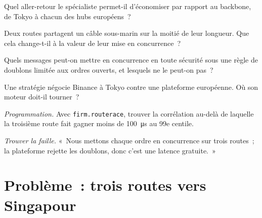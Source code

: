 \begin{exercise}[$\star$]\label{exo:nw:cross-region-crypto-networks:3}
Quel aller-retour le spécialiste permet-il d'économiser par rapport au backbone, de Tokyo à chacun des hubs européens~?
\end{exercise}

\begin{exercise}[$\star\star$]\label{exo:nw:cross-region-crypto-networks:4}
Deux routes partagent un câble sous-marin sur la moitié de leur longueur. Que cela change-t-il à la valeur de leur mise en concurrence~?
\end{exercise}

\begin{exercise}[$\star\star$]\label{exo:nw:cross-region-crypto-networks:5}
Quels messages peut-on mettre en concurrence en toute sécurité sous une règle de doublons limitée aux ordres ouverts, et lesquels ne le peut-on pas~?
\end{exercise}

\begin{exercise}[$\star\star$]\label{exo:nw:cross-region-crypto-networks:6}
Une stratégie négocie Binance à Tokyo contre une plateforme européenne. Où son moteur doit-il tourner~?
\end{exercise}

\begin{exercise}[$\star\star\star$]\label{exo:nw:cross-region-crypto-networks:7}
\emph{Programmation.} Avec \texttt{firm.routerace}, trouver la corrélation au-delà de laquelle la troisième route fait gagner moins de \qty{100}{\micro\second} au 99e
centile.
\end{exercise}

\begin{exercise}[$\star\star\star$]\label{exo:nw:cross-region-crypto-networks:8}
\emph{Trouver la faille.} «~Nous mettons chaque ordre en concurrence sur trois routes~; la plateforme rejette les doublons, donc c'est une latence gratuite.~»
\end{exercise}

\section{Problème~: trois routes vers Singapour}

